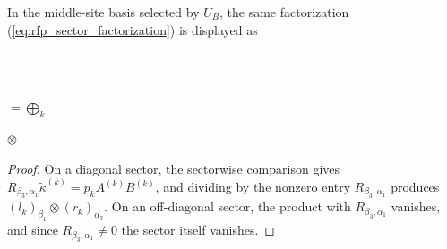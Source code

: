 In the middle-site basis selected by $U_B$, the same factorization
(\ref{eq:rfp_sector_factorization}) is displayed as
\begin{center}
    \tenkzkernel
    \begin{tenkz}[rows={op,op,op}, cols=2]
         \\
         \\
    \end{tenkz}
    $ = \bigoplus_k$
    \begin{tenkz}[cols=1, west=open]
    \end{tenkz}
    $ \otimes $
    \begin{tenkz}[cols=1, east=open]
    \end{tenkz}
\end{center}

\begin{proof}
    \leanok
    On a diagonal sector, the sectorwise comparison gives
    $R_{\beta_3,\alpha_1}\widetilde\kappa^{(k)}
        =p_kA^{(k)}B^{(k)}$, and dividing by the nonzero entry
    $R_{\beta_3,\alpha_1}$ produces
    $(l_k)_{\beta_1}\otimes(r_k)_{\alpha_3}$.
    On an off-diagonal sector, the product with $R_{\beta_3,\alpha_1}$
    vanishes, and since $R_{\beta_3,\alpha_1}\ne0$ the sector itself
    vanishes.
\end{proof}

